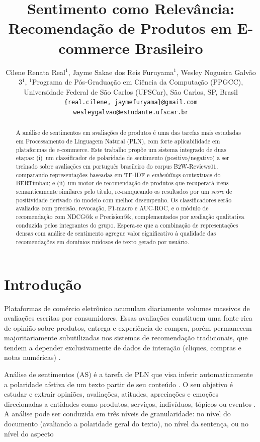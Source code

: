 \documentclass{IEEEtran}
\title{Sentimento como Relevância: Recomendação de Produtos em E-commerce Brasileiro}
\author{%
  Cilene Renata Real$^{1}$,
  Jayme Sakae dos Reis Furuyama$^{1}$,
  Wesley Nogueira Galvão 3$^{1}$,
  $^{1}$Programa de Pós-Graduação em Ciência da Computação (PPGCC),
  Universidade Federal de São Carlos (UFSCar), São Carlos, SP, Brasil\\
  \texttt{\{real.cilene, jaymefuryama\}@gmail.com}\\
  \texttt{wesleygalvao@estudante.ufscar.br}
}
\begin{document}
\maketitle

\begin{abstract}
A análise de sentimentos em avaliações de produtos é uma das tarefas mais estudadas em Processamento de Linguagem Natural (PLN), com forte aplicabilidade em plataformas de e-commerce. Este trabalho propõe um sistema integrado de duas etapas: (i)~um classificador de polaridade de sentimento (positivo/negativo) a ser treinado sobre avaliações em português brasileiro do corpus B2W-Reviews01, comparando representações baseadas em TF-IDF e \textit{embeddings} contextuais do BERTimbau; e (ii)~um motor de recomendação de produtos que recuperará itens semanticamente similares pelo título, re-ranqueando os resultados por um \textit{score} de positividade derivado do modelo com melhor desempenho. Os classificadores serão avaliados com precisão, revocação, F1-macro e AUC-ROC, e o módulo de recomendação com NDCG@k e Precision@k, complementados por avaliação qualitativa conduzida pelos integrantes do grupo. Espera-se que a combinação de representações densas com análise de sentimento agregue valor significativo à qualidade das recomendações em domínios ruidosos de texto gerado por usuário.
\end{abstract}

\section{Introdução}
\label{sec:intro}

Plataformas de comércio eletrônico acumulam diariamente volumes massivos de avaliações escritas por consumidores. Essas avaliações constituem uma fonte rica de opinião sobre produtos, entrega e experiência de compra, porém permanecem majoritariamente subutilizadas nos sistemas de recomendação tradicionais, que tendem a depender exclusivamente de dados de interação (cliques, compras e notas numéricas) \cite{ahmed2025sentimentaware}.

Análise de sentimentos (AS) é a tarefa de PLN que visa inferir automaticamente a polaridade afetiva de um texto partir de seu conteúdo \cite{alzahrani2022intelligent}. O seu objetivo é estudar e extrair opiniões, avaliações, atitudes, apreciações e emoções direcionadas a entidades como produtos, serviços, indivíduos, tópicos ou eventos \cite{BPLN_livro_4ed:2026}. A análise pode ser conduzida em três níveis de granularidade: no nível do documento (avaliando a polaridade geral do texto), no nível da sentença, ou no nível do aspecto
\end{document}
